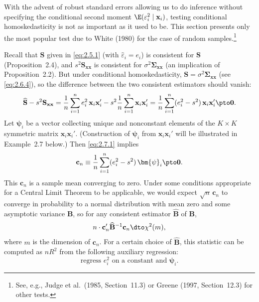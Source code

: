 
With the advent of robust standard errors allowing us to do inference without specifying
the conditional second moment $\E(\varepsilon_i^2 \mid \mathbf{x}_i)$, testing conditional
homoskedasticity is not as important as it used to be.  This section presents only the
most popular test due to White (1980) for the case of random samples.\footnote{See,
e.g., Judge et al.\ (1985, Section~11.3) or Greene (1997, Section~12.3) for other tests.}

Recall that $\widehat{\mathbf{S}}$ given in \eqref{eq:2.5.1} (with
$\hat{\varepsilon}_i = e_i$) is consistent for $\mathbf{S}$ (Proposition~2.4), and
$s^2 \mathbf{S}_{\mathbf{xx}}$ is consistent for $\sigma^2 \bm{\Sigma}_{\mathbf{xx}}$
(an implication of Proposition~2.2).  But under conditional homoskedasticity,
$\mathbf{S} = \sigma^2 \bm{\Sigma}_{\mathbf{xx}}$ (see \eqref{eq:2.6.4}), so the
difference between the two consistent estimators should vanish:
\begin{equation}
  \widehat{\mathbf{S}} - s^2 \mathbf{S}_{\mathbf{xx}}
    = \frac{1}{n} \sum_{i=1}^{n} e_i^2\, \mathbf{x}_i \mathbf{x}_i'
    - s^2 \frac{1}{n} \sum_{i=1}^{n} \mathbf{x}_i \mathbf{x}_i'
    = \frac{1}{n} \sum_{i=1}^{n} (e_i^2 - s^2)\, \mathbf{x}_i \mathbf{x}_i'
    \pto \mathbf{0}.
  \label{eq:2.7.1}
\end{equation}
Let $\bm{\psi}_i$ be a vector collecting unique and nonconstant elements of the
$K \times K$ symmetric matrix $\mathbf{x}_i \mathbf{x}_i'$.  (Construction of
$\bm{\psi}_i$ from $\mathbf{x}_i \mathbf{x}_i'$ will be illustrated in Example~2.7
below.)  Then \eqref{eq:2.7.1} implies
\begin{equation}
  \mathbf{c}_n \equiv \frac{1}{n} \sum_{i=1}^{n}
    (e_i^2 - s^2)\, \bm{\psi}_i \pto \mathbf{0}.
  \label{eq:2.7.2}
\end{equation}
This $\mathbf{c}_n$ is a sample mean converging to zero.  Under some conditions
appropriate for a Central Limit Theorem to be applicable, we would expect
$\sqrt{n}\,\mathbf{c}_n$ to converge in probability to a normal distribution with mean
zero and some asymptotic variance $\mathbf{B}$, so for any consistent estimator
$\widehat{\mathbf{B}}$ of $\mathbf{B}$,
\begin{equation}
  n \cdot \mathbf{c}_n' \widehat{\mathbf{B}}^{-1} \mathbf{c}_n
    \dto \chi^2(m),
  \label{eq:2.7.3}
\end{equation}
where $m$ is the dimension of $\mathbf{c}_n$.  For a certain choice of
$\widehat{\mathbf{B}}$, this statistic can be computed as $nR^2$ from the following
auxiliary regression:
\begin{equation}
  \text{regress } e_i^2 \text{ on a constant and } \bm{\psi}_i.
  \label{eq:2.7.4}
\end{equation}

